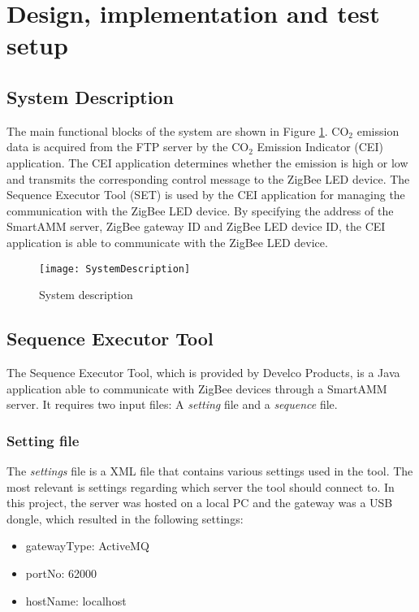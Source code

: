 \documentclass[Main]{subfiles}
\begin{document}
\section{Design, implementation and test setup} %
\label{sec:design_implementation_test_setup}

	\subsection{System Description}
		The main functional blocks of the system are shown in Figure \ref{fig:sysDesc}. 
		CO$_2$ emission data is acquired from the FTP server by the CO$_2$ Emission Indicator (CEI) application. 
		The CEI application determines whether the emission is high or low and transmits the corresponding control message to the ZigBee LED device. 
		The Sequence Executor Tool (SET) is used by the CEI application for managing the communication with the ZigBee LED device. 
		By specifying the address of the SmartAMM server, ZigBee gateway ID and ZigBee LED device ID, the CEI application is able to communicate with the ZigBee LED device.  

		\begin{figure}[H]
		\centering
		\texttt{[image: SystemDescription]}
		\caption{System description}
		\label{fig:sysDesc}
		\end{figure}




	 


	\newpage
	\subsection{Sequence Executor Tool}
		The Sequence Executor Tool, which is provided by Develco Products, is a Java application able to communicate with ZigBee devices through a SmartAMM server.
		It requires two input files: A \emph{setting} file and a \emph{sequence} file.

		\subsubsection{Setting file}
			The \emph{settings} file is a XML file that contains various settings used in the tool. 
			The most relevant is settings regarding which server the tool should connect to. 
			In this project, the server was hosted on a local PC and the gateway was a USB dongle, which resulted in the following settings:
			\begin{itemize}
				\item gatewayType: ActiveMQ
				\item portNo: 62000
				\item hostName: localhost
			\end{itemize}
\end{document}
